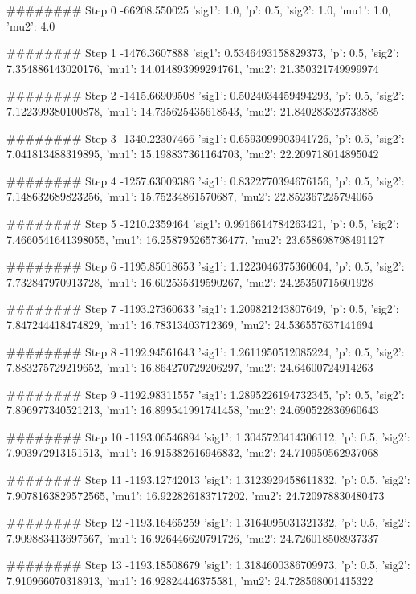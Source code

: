 ########
Step 0
-66208.550025
{'sig1': 1.0, 'p': 0.5, 'sig2': 1.0, 'mu1': 1.0, 'mu2': 4.0}


########
Step 1
-1476.3607888
{'sig1': 0.5346493158829373, 'p': 0.5, 'sig2': 7.354886143020176, 'mu1': 14.014893999294761, 'mu2': 21.350321749999974}


########
Step 2
-1415.66909508
{'sig1': 0.5024034459494293, 'p': 0.5, 'sig2': 7.122399380100878, 'mu1': 14.735625435618543, 'mu2': 21.840283323733885}


########
Step 3
-1340.22307466
{'sig1': 0.6593099903941726, 'p': 0.5, 'sig2': 7.041813488319895, 'mu1': 15.198837361164703, 'mu2': 22.209718014895042}


########
Step 4
-1257.63009386
{'sig1': 0.8322770394676156, 'p': 0.5, 'sig2': 7.148632689823256, 'mu1': 15.75234861570687, 'mu2': 22.852367225794065}


########
Step 5
-1210.2359464
{'sig1': 0.9916614784263421, 'p': 0.5, 'sig2': 7.4660541641398055, 'mu1': 16.258795265736477, 'mu2': 23.658698798491127}


########
Step 6
-1195.85018653
{'sig1': 1.1223046375360604, 'p': 0.5, 'sig2': 7.732847970913728, 'mu1': 16.602535319590267, 'mu2': 24.25350715601928}


########
Step 7
-1193.27360633
{'sig1': 1.209821243807649, 'p': 0.5, 'sig2': 7.847244418474829, 'mu1': 16.78313403712369, 'mu2': 24.536557637141694}


########
Step 8
-1192.94561643
{'sig1': 1.2611950512085224, 'p': 0.5, 'sig2': 7.883275729219652, 'mu1': 16.864270729206297, 'mu2': 24.64600724914263}


########
Step 9
-1192.98311557
{'sig1': 1.2895226194732345, 'p': 0.5, 'sig2': 7.896977340521213, 'mu1': 16.899541991741458, 'mu2': 24.690522836960643}


########
Step 10
-1193.06546894
{'sig1': 1.3045720414306112, 'p': 0.5, 'sig2': 7.903972913151513, 'mu1': 16.915382616946832, 'mu2': 24.710950562937068}


########
Step 11
-1193.12742013
{'sig1': 1.3123929458611832, 'p': 0.5, 'sig2': 7.9078163829572565, 'mu1': 16.922826183717202, 'mu2': 24.720978830480473}


########
Step 12
-1193.16465259
{'sig1': 1.3164095031321332, 'p': 0.5, 'sig2': 7.909883413697567, 'mu1': 16.926446620791726, 'mu2': 24.726018508937337}


########
Step 13
-1193.18508679
{'sig1': 1.3184600386709973, 'p': 0.5, 'sig2': 7.910966070318913, 'mu1': 16.92824446375581, 'mu2': 24.728568001415322}


